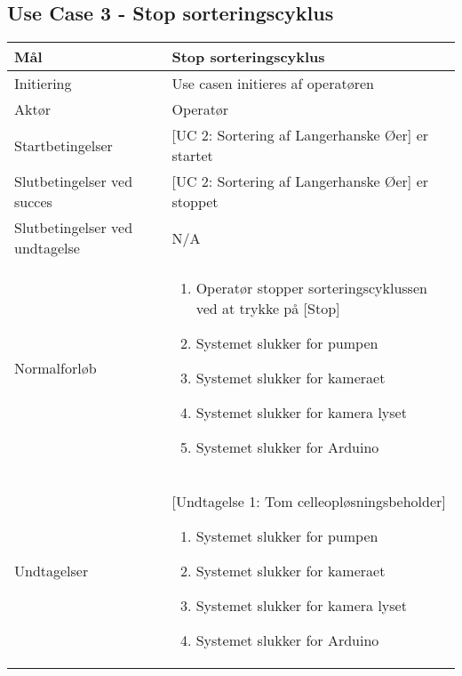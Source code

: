 \subsection{Use Case 3 - Stop sorteringscyklus}
\label{uc:3}
\begin{center}
		\begin{longtable}{ | m{4cm} | m{8cm}| } 
			\hline
			Mål & Stop sorteringscyklus \\ 
			\hline
			Initiering &  Use casen initieres af operatøren\\
			\hline
			Aktør & Operatør \\ 
			\hline
			Startbetingelser & [UC 2: Sortering af Langerhanske Øer] er startet\\ 
			\hline	
			Slutbetingelser ved succes & [UC 2: Sortering af Langerhanske Øer] er stoppet \\
			\hline
			Slutbetingelser ved undtagelse & N/A \\
			\hline
			Normalforløb & \begin{enumerate}
				\setlength\itemsep{0cm} %
				\item Operatør stopper sorteringscyklussen ved at trykke på [Stop]
				\subitem [Undtagelse 1: Tom celleopløsningsbeholder]
				\item Systemet slukker for pumpen
				\item Systemet slukker for kameraet
				\item Systemet slukker for kamera lyset
				\item Systemet slukker for Arduino
			\end{enumerate} \\ 
			\hline
			Undtagelser & [Undtagelse 1: Tom celleopløsningsbeholder]
			
			\begin{enumerate}
			\item Systemet slukker for pumpen
			\item Systemet slukker for kameraet
			\item Systemet slukker for kamera lyset
			\item Systemet slukker for Arduino
			\end{enumerate} \\
			\hline
		\end{longtable}
		
	\end{center}
	\pagebreak